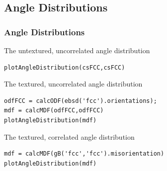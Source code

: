 \documentclass[compress]{beamer}
\begin{document}
\subsection*{Angle Distributions}

\begin{frame}[fragile]
  \frametitle{Angle Distributions}

   \begin{overlayarea}{\textwidth}{0.55\textheight}

    The untextured, uncorrelated angle distribution
    \vspace{-.2cm}
    \begin{lstlisting}[style=input]
plotAngleDistribution(csFCC,csFCC)
    \end{lstlisting}

    \pause
    The textured, uncorrelated angle distribution
    \vspace{-.2cm}
    \begin{lstlisting}[style=input]
odfFCC = calcODF(ebsd('fcc').orientations);
mdf = calcMDF(odfFCC,odfFCC)
plotAngleDistribution(mdf)
\end{lstlisting}

\pause
    The textured, correlated angle distribution
    \vspace{-.2cm}
    \begin{lstlisting}[style=input]
mdf = calcMDF(gB('fcc','fcc').misorientation)
plotAngleDistribution(mdf)
\end{lstlisting}

  \end{overlayarea}


\end{frame}
\end{document}
